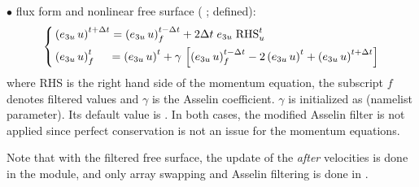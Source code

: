 \documentclass[../tex_main/NEMO_manual]{subfiles}
\begin{document}
$\bullet$ flux form and nonlinear free surface
( ;  defined):
\begin{equation} \label{eq:dynnxt_flux}
\left\{   \begin{aligned}
&\left(e_{3u}\,u\right)^{t+\Delta t} = \left(e_{3u}\,u\right)_f^{t-\Delta t} + 2\Delta t \; e_{3u} \;\text{RHS}_u^t  	\\
&\left(e_{3u}\,u\right)_f^t \;\quad = \left(e_{3u}\,u\right)^t
  +\gamma \,\left[ {\left(e_{3u}\,u\right)_f^{t-\Delta t} -2\left(e_{3u}\,u\right)^t+\left(e_{3u}\,u\right)^{t+\Delta t}} \right]
\end{aligned}   \right.
\end{equation} 
where RHS is the right hand side of the momentum equation,
the subscript $f$ denotes filtered values and $\gamma$ is the Asselin coefficient.
$\gamma$ is initialized as  (namelist parameter).
Its default value is .
In both cases, the modified Asselin filter is not applied since perfect conservation is not an issue for
the momentum equations.

Note that with the filtered free surface,
the update of the \textit{after} velocities is done in the  module,
and only array swapping and Asselin filtering is done in .

\end{document}
